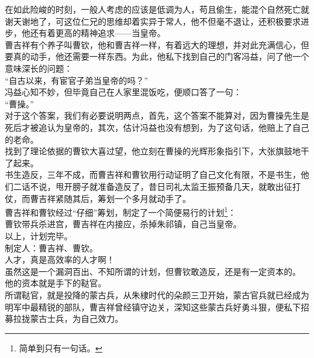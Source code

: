 \begin{multicols}{\theparacolNo}
在如此险峻的时刻，一般人考虑的应该是低调为人，苟且偷生，能混个自然死亡就谢天谢地了，可这位仁兄的思维却着实异于常人，他不但毫不退让，还积极要求进步，他还有着更高的精神追求——当皇帝。\\

曹吉祥有个养子叫曹钦，他和曹吉祥一样，有着远大的理想，并对此充满信心，但要真的动手，他还需要一样东西。为此，他私下找到自己的门客冯益，问了他一个意味深长的问题：\\

“自古以来，有宦官子弟当皇帝的吗？”\\

冯益心知不妙，但毕竟自己在人家里混饭吃，便顺口答了一句：\\

“曹操。”\\

对于这个答案，我们有必要说明两点，首先，这个答案不能算对，因为曹操先生是死后才被追认为皇帝的，其次，估计冯益也没有想到，为了这句话，他赔上了自己的老命。\\

找到了理论依据的曹钦大喜过望，他立刻在曹操的光辉形象指引下，大张旗鼓地干了起来。\\

书生造反，三年不成，而曹吉祥和曹钦用行动证明了自己文化有限，不是书生，他们二话不说，甩开膀子就准备造反了，昔日司礼太监王振预备几天，就敢出征打仗，而曹吉祥紧随其后，筹划一个多月就动手了。\\

曹吉祥和曹钦经过“仔细”筹划，制定了一个简便易行的计划\footnote{简单到只有一句话。}：\\

曹钦带兵杀进宫，曹吉祥在内接应，杀掉朱祁镇，自己当皇帝。\\

以上，计划完毕。\\

制定人：曹吉祥、曹钦。\\

人才，真是高效率的人才啊！\\

虽然这是一个漏洞百出、不知所谓的计划，但曹钦敢造反，还是有一定资本的。\\

他的资本就是手下的鞑官。\\

所谓鞑官，就是投降的蒙古兵，从朱棣时代的朵颜三卫开始，蒙古官兵就已经成为明军中最精锐的部队，曹吉祥曾经镇守边关，深知这些蒙古兵好勇斗狠，便私下招募拉拢蒙古士兵，为自己效力。\\


\end{multicols}
